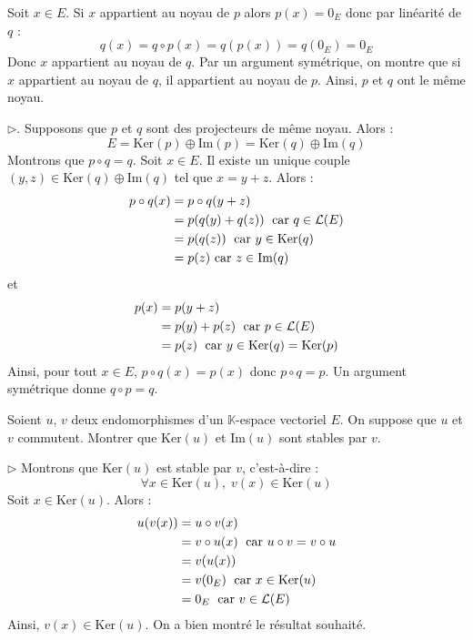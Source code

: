 \documentclass[a4paper,10pt]{report}
\begin{document}
\medskip

\noindent Soit $x \in E$. Si $x$ appartient au noyau de $p$ alors $p(x) = 0_E$ donc par linéarité de $q$ :
$$ q(x)= q \circ p(x) = q(p(x))=q(0_E) = 0_E$$
Donc $x$ appartient au noyau de $q$. Par un argument symétrique, on montre que si $x$ appartient au noyau de $q$, il appartient au noyau de $p$. Ainsi, $p$ et $q$ ont le même noyau.

\medskip

\noindent $\rhd$. Supposons que $p$ et $q$ sont des projecteurs de même noyau. Alors :
$$ E = \textrm{Ker}(p) \oplus \textrm{Im}(p) = \textrm{Ker}(q) \oplus \textrm{Im}(q)$$
Montrons que $p \circ q= q$. Soit $x \in E$. Il existe un unique couple $(y,z) \in \textrm{Ker}(q) \oplus \textrm{Im}(q)$ tel que $x=y+z$. Alors :
\begin{align*}
p \circ q(x) & = p\circ q (y+z) \\
& = p (q(y)+q(z))  \; \hbox{ car } q \in \mathcal{L}(E) \\
& = p (q(z))   \; \hbox{ car } y \in \textrm{Ker}(q) \\
& = p(z) \hbox{ car } z \in \textrm{Im}(q)
\end{align*}
et 
\begin{align*}
p(x) & = p(y+z) \\
& = p(y)+p(z) \; \hbox{ car } p \in \mathcal{L}(E) \\
& =  p(z) \; \hbox{ car } y \in \textrm{Ker}(q) = \textrm{Ker}(p)
\end{align*}
Ainsi, pour tout $x \in E$, $p \circ q(x)=p(x)$ donc $p \circ q = p$. Un argument symétrique donne $q \circ p = q$.

\begin{Exa} Soient $u$, $v$ deux endomorphismes d'un $\mathbb{K}$-espace vectoriel $E$. On suppose que $u$ et $v$ commutent. Montrer que $\textrm{Ker}(u)$ et $\textrm{Im}(u)$ sont stables par $v$.
\end{Exa} 

\corr 

\noindent $\rhd$ Montrons que $\textrm{Ker}(u)$ est stable par $v$, c'est-à-dire :
$$ \forall x \in \textrm{Ker}(u), \; v(x) \in \textrm{Ker}(u)$$
Soit $x \in \textrm{Ker}(u)$. Alors :
\begin{align*}
u (v(x)) & = u \circ v (x) \\
& = v \circ u (x) \; \hbox{ car } u \circ v = v \circ u \\
& = v(u(x)) \\
& = v(0_E) \; \hbox{ car } x \in \textrm{Ker}(u) \\
& = 0_E \; \hbox{ car } v \in \mathcal{L}(E)
\end{align*}
Ainsi, $v(x) \in \textrm{Ker}(u)$. On a bien montré le résultat souhaité.
\end{document}
